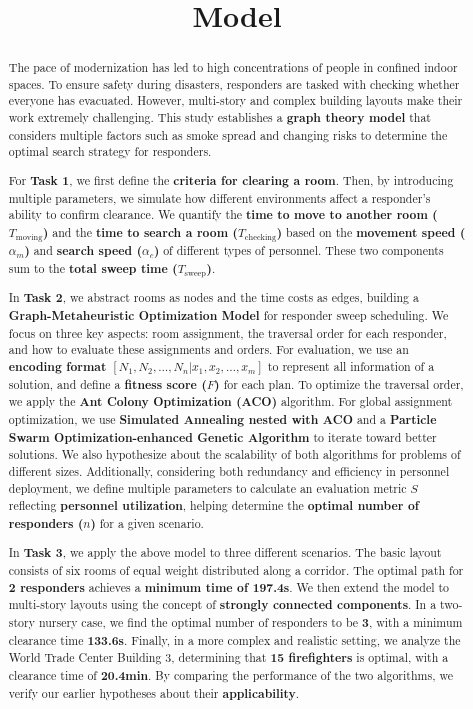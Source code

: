 \documentclass[12pt]{article}  %
\title{Model}  %
\numberwithin{figure}{section}
\begin{document}
	\begin{abstract}


The pace of modernization has led to high concentrations of people in confined indoor spaces. To ensure safety during disasters, responders are tasked with checking whether everyone has evacuated. However, multi-story and complex building layouts make their work extremely challenging. This study establishes a \textbf{graph theory model} that considers multiple factors such as smoke spread and changing risks to determine the optimal search strategy for responders.


For \textbf{Task 1}, we first define the \textbf{criteria for clearing a room}. Then, by introducing multiple parameters, we simulate how different environments affect a responder’s ability to confirm clearance. We quantify the \textbf{time to move to another room ($T_{\text{moving}}$)} and the \textbf{time to search a room ($T_{\text{checking}}$)} based on the \textbf{movement speed ($\alpha_m$)} and \textbf{search speed ($\alpha_c$)} of different types of personnel. These two components sum to the \textbf{total sweep time ($T_{\text{sweep}}$)}.


In \textbf{Task 2}, we abstract rooms as nodes and the time costs as edges, building a \textbf{Graph-Metaheuristic Optimization Model} for responder sweep scheduling. We focus on three key aspects: room assignment, the traversal order for each responder, and how to evaluate these assignments and orders. For evaluation, we use an \textbf{encoding format $[N_1,N_2,\dots,N_n|x_1,x_2,\dots,x_m]$} to represent all information of a solution, and define a \textbf{fitness score ($F$)} for each plan. To optimize the traversal order, we apply the \textbf{Ant Colony Optimization (ACO)} algorithm. For global assignment optimization, we use \textbf{Simulated Annealing nested with ACO} and a \textbf{Particle Swarm Optimization-enhanced Genetic Algorithm} to iterate toward better solutions. We also hypothesize about the scalability of both algorithms for problems of different sizes. Additionally, considering both redundancy and efficiency in personnel deployment, we define multiple parameters to calculate an evaluation metric \textbf{$S$} reflecting \textbf{personnel utilization}, helping determine the \textbf{optimal number of responders ($n$)} for a given scenario.


In \textbf{Task 3}, we apply the above model to three different scenarios. The basic layout consists of six rooms of equal weight distributed along a corridor. The optimal path for \textbf{2 responders} achieves a \textbf{minimum time of 197.4s}. We then extend the model to multi-story layouts using the concept of \textbf{strongly connected components}. In a two-story nursery case, we find the optimal number of responders to be \textbf{3}, with a minimum clearance time \textbf{133.6s}. Finally, in a more complex and realistic setting, we analyze the World Trade Center Building 3, determining that \textbf{15 firefighters} is optimal, with a clearance time of \textbf{20.4min}. By comparing the performance of the two algorithms, we verify our earlier hypotheses about their \textbf{applicability}.



\end{abstract}
\end{document}
